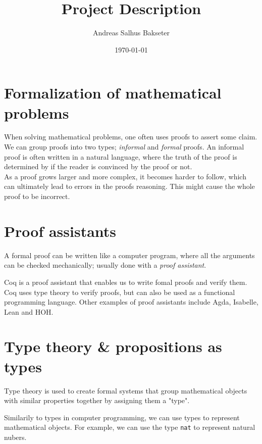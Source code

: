\documentclass[a4paper,14pt]{article}
\title{\textbf{Project Description}}
\author{Andreas Salhus Bakseter}
\date{\today}
\begin{document}
\maketitle

\section{Formalization of mathematical problems}

When solving mathematical problems, one often uses proofs
to assert some claim. We can group proofs into two types; \textit{informal} and \textit{formal} proofs.
An informal proof is often written in a natural language, where the truth
of the proof is determined by if the reader is convinced by the proof or not.
\supercite{bpierce}
\\

As a proof grows larger and more complex, it becomes harder to follow, which can
ultimately lead to errors in the proofs reasoning. This might cause the whole proof
to be incorrect.
\supercite{rkhamsi}


\section{Proof assistants}

A formal proof can be written like a computer program, where all the
arguments can be checked mechanically; usually done with a \textit{proof assistant}.

Coq is a proof assistant that enables us to write fomal proofs and verify them.
Coq uses type theory to verify proofs, but can also be used as a functional programming language.
\supercite{cintro} Other examples of proof assistants include Agda, Isabelle, Lean and HOH.

\newpage

\section{Type theory \& propositions as types}

Type theory is used to create formal systems that group mathematical objects
with similar properties together by assigning them a "type".

Similarily to types in computer programming, we can use types to represent mathematical
objects. For example, we can use the type \texttt{nat} to represent natural nubers.
\\
\end{document}
